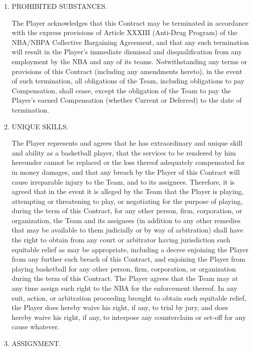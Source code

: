 \documentclass[
]{book}
\begin{document}
\begin{enumerate}
\def\labelenumi{\arabic{enumi}.}
\setcounter{enumi}{7}
\item
  PROHIBITED SUBSTANCES.

  The Player acknowledges that this Contract may be terminated in accordance with the express provisions of Article XXXIII (Anti-Drug Program) of the NBA/NBPA Collective Bargaining Agreement, and that any such termination will result in the Player's immediate dismissal and disqualification from any employment by the NBA and any of its teams. Notwithstanding any terms or provisions of this Contract (including any amendments hereto), in the event of such termination, all obligations of the Team, including obligations to pay Compensation, shall cease, except the obligation of the Team to pay the Player's earned Compensation (whether Current or Deferred) to the date of termination.
\item
  UNIQUE SKILLS.

  The Player represents and agrees that he has extraordinary and unique skill and ability as a basketball player, that the services to be rendered by him hereunder cannot be replaced or the loss thereof adequately compensated for in money damages, and that any breach by the Player of this Contract will cause irreparable injury to the Team, and to its assignees. Therefore, it is agreed that in the event it is alleged by the Team that the Player is playing, attempting or threatening to play, or negotiating for the purpose of playing, during the term of this Contract, for any other person, firm, corporation, or organization, the Team and its assignees (in addition to any other remedies that may be available to them judicially or by way of arbitration) shall have the right to obtain from any court or arbitrator having jurisdiction such equitable relief as may be appropriate, including a decree enjoining the Player from any further such breach of this Contract, and enjoining the Player from playing basketball for any other person, firm, corporation, or organization during the term of this Contract. The Player agrees that the Team may at any time assign such right to the NBA for the enforcement thereof. In any suit, action, or arbitration proceeding brought to obtain such equitable relief, the Player does hereby waive his right, if any, to trial by jury, and does hereby waive his right, if any, to interpose any counterclaim or set-off for any cause whatever.
\item
  ASSIGNMENT.
\end{enumerate}
\end{document}
